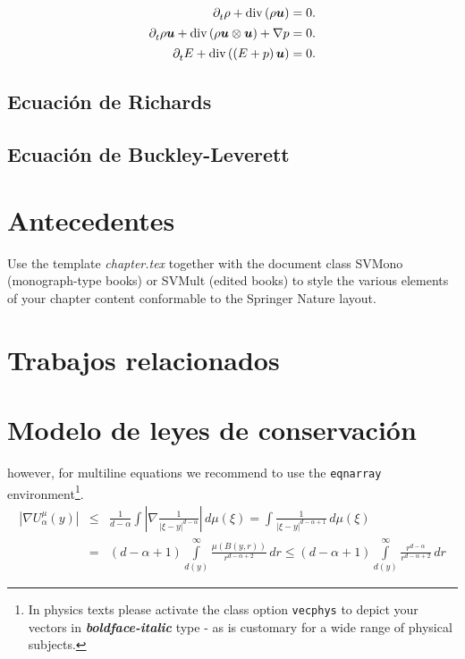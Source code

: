 \begin{align}
	\difcp{\rho}{t}+
	\operatorname{div}
	\left(\rho\bm{u}\right)                       & =
	0.                                                \\
	\difcp{\rho\bm{u}}{t}+
	\operatorname{div}
	\left(\rho\bm{u}\otimes\bm{u}\right)+\nabla p & =
	0.                                                \\
	\difcp{E}{t}+
	\operatorname{div}
	\left(\left(E+p\right)\bm{u}\right)           & =
	0.
\end{align}

\subsection*{Ecuación de Richards}

\subsection*{Ecuación de Buckley-Leverett}

\section{Antecedentes}
\label{sec:1}
Use the template \emph{chapter.tex} together with the document class SVMono (monograph-type books) or SVMult (edited books) to style the various elements of your chapter content conformable to the Springer Nature layout.

\section{Trabajos relacionados}
\section{Modelo de leyes de conservación}
\label{sec:2}

\eject

however, for multiline equations we recommend to use the \verb|eqnarray| environment\footnote{In physics texts please activate the class option \texttt{vecphys} to depict your vectors in \textbf{\itshape boldface-italic} type - as is customary for a wide range of physical subjects.}.
\begin{eqnarray}
	\left|\nabla U_{\alpha}^{\mu}(y)\right| &\le&\frac1{d-\alpha}\int
	\left|\nabla\frac1{|\xi-y|^{d-\alpha}}\right|\,d\mu(\xi) =
	\int \frac1{|\xi-y|^{d-\alpha+1}} \,d\mu(\xi)\qquad  \\
	&=&(d-\alpha+1) \int\limits_{d(y)}^\infty
	\frac{\mu(B(y,r))}{r^{d-\alpha+2}}\,dr \le (d-\alpha+1)
	\int\limits_{d(y)}^\infty \frac{r^{d-\alpha}}{r^{d-\alpha+2}}\,dr
	\label{eq:01}
\end{eqnarray}

